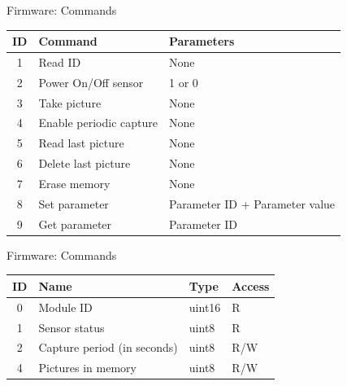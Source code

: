 
\begin{frame}{Firmware: Commands}

\begin{table}[!htb]
    \centering
    \label{tab:commands}
    \begin{tabular}{cll}
        \toprule[1.5pt]
        \textbf{ID} & \textbf{Command} & \textbf{Parameters}\\
        \midrule
        1 & Read ID                 & None \\
        2 & Power On/Off sensor     & 1 or 0 \\
        3 & Take picture            & None \\
        4 & Enable periodic capture & None \\
        5 & Read last picture       & None \\
        6 & Delete last picture     & None \\
        7 & Erase memory            & None \\
        8 & Set parameter           & Parameter ID + Parameter value \\
        9 & Get parameter           & Parameter ID \\
        \bottomrule[1.5pt]
    \end{tabular}
\end{table}

\end{frame}

\begin{frame}{Firmware: Commands}

\begin{table}[!htb]
    \centering
    \label{tab:parameters}
    \begin{tabular}{clll}
        \toprule[1.5pt]
        \textbf{ID} & \textbf{Name} & \textbf{Type} & \textbf{Access} \\
        \midrule
        0 & Module ID                   & uint16 & R\\
        1 & Sensor status               & uint8  & R  \\
        2 & Capture period (in seconds) & uint8  & R/W \\
        4 & Pictures in memory          & uint8  & R/W \\
        \bottomrule[1.5pt]
    \end{tabular}
\end{table}

\end{frame}